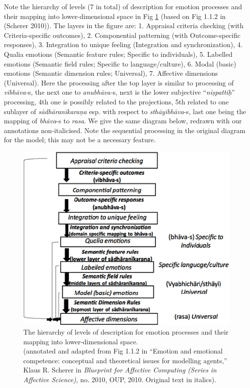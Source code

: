 Note the hierarchy of levels (7 in total) of description for emotion processes and their mapping into lower-dimensional space in Fig \ref{chap3-fig1} (based on Fig 1.1.2 in (Scherer 2010)). The layers in the figure are: 1. Appraisal criteria checking (with Criteria-specific outcomes), 2. Componential patterning (with Outcome-specific responses), 3. Integration to unique feeling (Integration and synchronization), 4. Qualia emotions (Semantic feature rules; Specific to individuals), 5. Labelled emotions (Semantic field rules; Specific to language/culture), 6. Modal (basic) emotions (Semantic dimension rules; Universal), 7. Affective dimensions (Universal). Here the processing after the top layer is similar to processing of \textsl{vibhāva-}s, the next one to \textsl{anubhāva-}s, next is the lower subjective “\textsl{niṣpattiḥ}” processing, 4th one is possibly related to the projections, 5th related to one sublayer of \textsl{sādhāranīkaraṇa} esp. with respect to \textsl{sthāyibhāva}-s, last one being the mapping of \textsl{bhāva}-s to \textsl{rasa}. We give the same diagram below, redrawn with our annotations non-italicised. Note the sequential processing in the original diagram for the model; this may not be a necessary feature. 

\begin{figure}[H]
\centering
\includegraphics[scale=.9]{figures/3.eps}
\caption{The hierarchy of levels of description for emotion processes and their mapping into lower-dimensional space.\\
(annotated and adapted from Fig 1.1.2 in “Emotion and emotional competence: conceptual and theoretical issues for modelling agents,” Klaus R. Scherer in \textsl{Blueprint for Affective Computing (Series in Affective Science)}, no. 2010, OUP, 2010. Original text in italics).}\label{chap3-fig1}
\end{figure}

